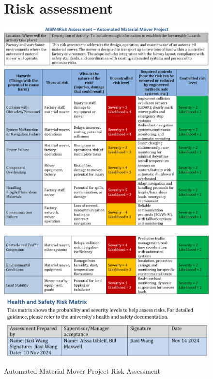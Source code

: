 \documentclass[12pt,titlepage]{article}
\begin{document}
\vspace{-30pt}
\begin{figure} [h]
    \section{Risk assessment} 

     \centering   
     \includegraphics[width=0.85\linewidth]{RiskA1.png}
    \includegraphics[width=0.85\linewidth]{RiskA2.png}
    
    \vspace{-3pt}
    \includegraphics[width=0.85\linewidth]{RiskA3.png}
    \includegraphics[width=0.85\linewidth]{Risk5.png}
    \vspace{-5pt}
      \caption{Automated Material Mover Project Risk Assessment}
\end{figure}
\vspace{-25pt}
\end{document}
